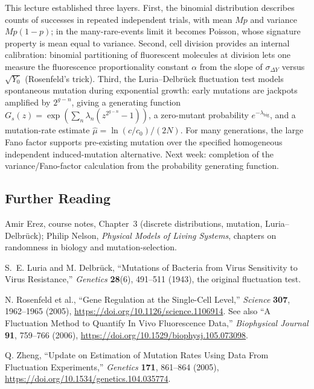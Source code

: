 This lecture established three layers. First, the binomial distribution describes counts of successes in repeated independent trials, with mean $Mp$ and variance $Mp(1-p)$; in the many-rare-events limit it becomes Poisson, whose signature property is mean equal to variance. Second, cell division provides an internal calibration: binomial partitioning of fluorescent molecules at division lets one measure the fluorescence proportionality constant $\alpha$ from the slope of $\sigma_{\Delta Y}$ versus $\sqrt{Y_0}$ (Rosenfeld's trick). Third, the Luria--Delbr{\"u}ck fluctuation test models spontaneous mutation during exponential growth: early mutations are jackpots amplified by $2^{g-n}$, giving a generating function $G_s(z)=\exp(\sum_n\lambda_n(z^{2^{g-n}}-1))$, a zero-mutant probability $e^{-\lambda_{\mathrm{big}}}$, and a mutation-rate estimate $\hat{\mu}=\ln(c/c_0)/(2N)$. For many generations, the large Fano factor supports pre-existing mutation over the specified homogeneous independent induced-mutation alternative. Next week: completion of the variance/Fano-factor calculation from the probability generating function.

\subsection*{Further Reading}
\begingroup\small
Amir Erez, course notes, Chapter~3 (discrete distributions, mutation, Luria--Delbr{\"u}ck); Philip Nelson, \emph{Physical Models of Living Systems}, chapters on randomness in biology and mutation-selection.

S.~E. Luria and M. Delbr{\"u}ck, ``Mutations of Bacteria from Virus Sensitivity to Virus Resistance,'' \emph{Genetics} \textbf{28}(6), 491--511 (1943), the original fluctuation test.

N. Rosenfeld et al., ``Gene Regulation at the Single-Cell Level,'' \emph{Science} \textbf{307}, 1962--1965 (2005), \url{https://doi.org/10.1126/science.1106914}. See also ``A Fluctuation Method to Quantify In Vivo Fluorescence Data,'' \emph{Biophysical Journal} \textbf{91}, 759--766 (2006), \url{https://doi.org/10.1529/biophysj.105.073098}.

Q. Zheng, ``Update on Estimation of Mutation Rates Using Data From Fluctuation Experiments,'' \emph{Genetics} \textbf{171}, 861--864 (2005), \url{https://doi.org/10.1534/genetics.104.035774}.
\endgroup
